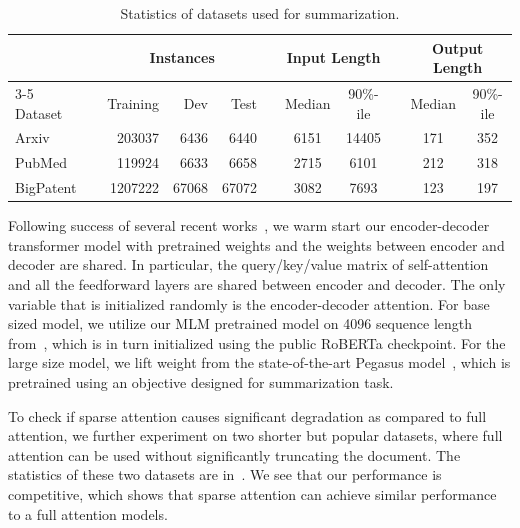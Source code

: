 \begin{table}[bht]
    \centering
    \small
    \begin{tabular}{@{}lrrrrrccrcc@{}}
    \toprule
    & & \multicolumn{3}{c}{Instances} & & \multicolumn{2}{c}{Input Length}& & \multicolumn{2}{c}{Output Length} \\
    \cmidrule{3-5} \cmidrule{7-8} \cmidrule{10-11}
    Dataset & & Training & Dev & Test & & Median & 90\%-ile & &  Median & 90\%-ile \\
    \midrule
       Arxiv \citep{cohan2018discourse} & & 203037 & 6436 & 6440 & & 6151 & 14405 & & 171 & 352 \\
       PubMed \citep{cohan2018discourse} & & 119924 & 6633 & 6658 & & 2715 & 6101 & & 212 & 318 \\
       BigPatent \citep{sharma2019bigpatent} & &  1207222 & 67068 & 67072 & & 3082 & 7693  & & 123 & 197  \\
    \bottomrule
    \end{tabular}
    \vspace{2mm}
     \caption{Statistics of datasets used for summarization.}
    \label{tab:long_sum_data}
\end{table}

Following success of several recent works~\citep{rothe2019leveraging,liu2019roberta}, we warm start our encoder-decoder \bigb transformer model with pretrained weights and the weights between encoder and decoder are shared.
In particular, the query/key/value matrix of self-attention and all the feedforward layers are shared between encoder and decoder.
The only variable that is initialized randomly is the encoder-decoder attention.
For base sized model, we utilize our MLM pretrained model on 4096 sequence length from~, which is in turn initialized using the public RoBERTa checkpoint.
For the large size model, we lift weight from the state-of-the-art Pegasus model~\citep{zhang2019pegasus}, which is pretrained using an objective designed for summarization task.


To check if sparse attention causes significant degradation as compared to full attention, we further experiment on two shorter but popular datasets, where full attention can be used without significantly truncating the document. 
The statistics of these two datasets are in~.
We see that our performance is competitive, which shows that sparse attention can achieve similar performance to a full attention models. 

